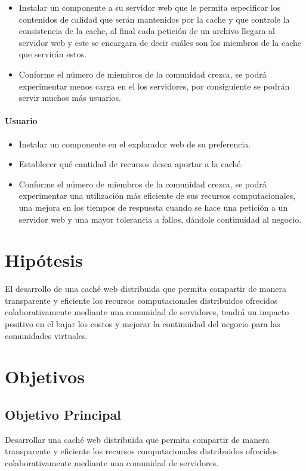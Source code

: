 \begin{itemize}
\item Instalar un componente a su servidor web que le permita especificar los contenidos de calidad que serán mantenidos por la cache y que controle la consistencia de la cache, al final cada petición de un archivo llegara al servidor web y este se encargara de decir cuáles son los miembros de la cache que servirán estos.
\item Conforme el número de miembros de la comunidad crezca, se podrá experimentar menos carga en el los servidores, por consiguiente se podrán servir muchos más usuarios.
\end{itemize}
 

\paragraph{Usuario}
\begin{itemize}
\item Instalar un componente en el  explorador web de su preferencia.
\item Establecer qué cantidad de recursos desea aportar a la caché.
\item Conforme el número de miembros de la comunidad crezca, se podrá experimentar una utilización más eficiente de sus recursos computacionales, una mejora en los tiempos de respuesta cuando se hace una petición a un servidor web y una mayor tolerancia a fallos, dándole continuidad al negocio. 
\end{itemize}


\section{Hipótesis}
El desarrollo de una caché web distribuida que permita compartir de manera transparente y eficiente los recursos computacionales distribuidos ofrecidos colaborativamente mediante una comunidad de servidores, tendrá un impacto positivo en el bajar los costos y mejorar la continuidad del negocio para las comunidades virtuales.

\section{Objetivos}
\subsection{Objetivo Principal}
Desarrollar una caché web distribuida que permita compartir de manera transparente y eficiente los recursos computacionales distribuidos ofrecidos colaborativamente mediante una comunidad de servidores.

